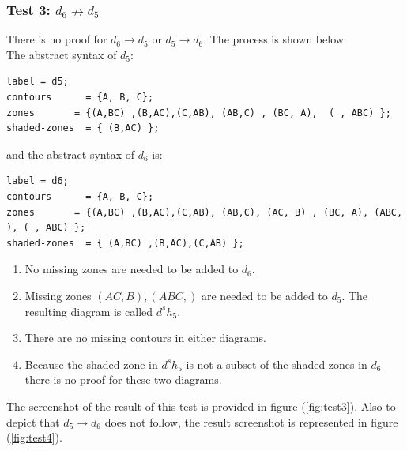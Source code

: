 \documentclass[10pt, a4paper, titlepage]{article}
\begin{document}
\subsubsection{Test 3: $ d_{6} \nrightarrow  d_{5} $}
There is no proof for $ d_{6} \rightarrow  d_{5} $ or $ d_{5} \rightarrow  d_{6} $. The process is shown below:\\

The abstract syntax of $d _{5} $:
\small
\begin{lstlisting}
label = d5;
contours      = {A, B, C};
zones		= {(A,BC) ,(B,AC),(C,AB), (AB,C) , (BC, A),  ( , ABC) };
shaded-zones  = { (B,AC) };
\end{lstlisting}
\large

and the abstract syntax of $ d_{6} $ is:

\small
\begin{lstlisting}
label = d6;
contours      = {A, B, C};
zones		= {(A,BC) ,(B,AC),(C,AB), (AB,C), (AC, B) , (BC, A), (ABC, ), ( , ABC) };
shaded-zones  = { (A,BC) ,(B,AC),(C,AB) };
\end{lstlisting}
\large

\begin{enumerate}
\item No missing zones are needed to be added to $ d_{6} $.
\item Missing zones $ (AC , B) , (ABC , )  $ are needed to be added to $ d_{5} $. The resulting diagram is called $ d^sh_{5} $.
\item There are no missing contours in either diagrams.
\item Because the shaded zone in $ d^sh_{5} $ is not a subset of the shaded zones in $ d_{6} $ there is no proof for these two diagrams.
\end{enumerate}  

The screenshot of the result of this test is provided in figure (\ref{fig:test3}). Also to depict that $  d_{5} \rightarrow d_{6} $ does not follow, the result screenshot is represented in figure (\ref{fig:test4}).
\end{document}
